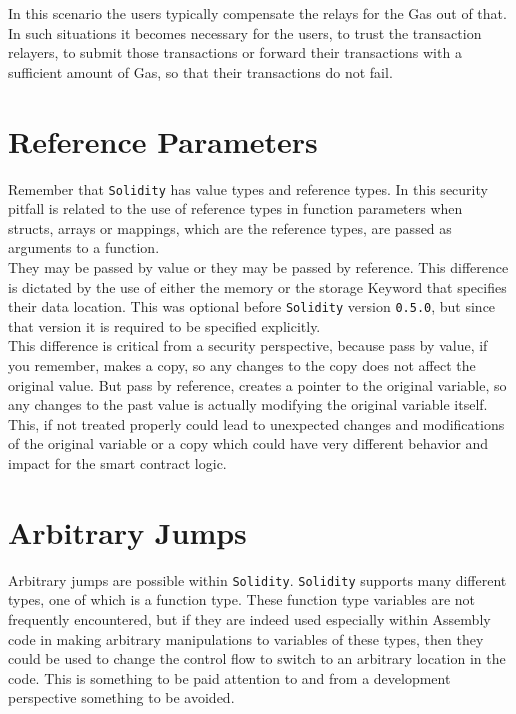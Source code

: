 In this scenario the users typically compensate the relays for the Gas out of that. In such situations it becomes necessary for the users, to trust the transaction relayers, to submit those transactions or forward their transactions with a sufficient amount of Gas, so that their transactions do not fail.

\section{Reference Parameters}

Remember that \texttt{Solidity} has value types and reference types. In this security pitfall is related to the use of reference types in function parameters when structs, arrays or mappings, which are the reference types, are passed as arguments to a function. \\

They may be passed by value or they may be passed by reference. This difference is dictated by the use of either the memory or the storage Keyword that specifies their data location. This was optional before \texttt{Solidity} version \texttt{0.5.0}, but since that version it is required to be specified explicitly. \\

This difference is critical from a security perspective, because pass by value, if you remember, makes a copy, so any changes to the copy does not affect the original value. But pass by reference, creates a pointer to the original variable, so any changes to the past value is actually modifying the original variable itself.\\

This, if not treated properly could lead to unexpected changes and modifications of the original variable or a copy which could have very different behavior and impact for the smart contract logic.

\section{Arbitrary Jumps}

Arbitrary jumps are possible within \texttt{Solidity}. \texttt{Solidity} supports many different types, one of which is a function type. These function type variables are not frequently encountered, but if they are indeed used especially within Assembly code in making arbitrary manipulations to variables of these types, then they could be used to change the control flow to switch to an arbitrary location in the code. This is something to be paid attention to and from a development perspective something to be avoided.\\


